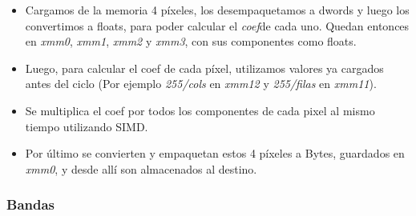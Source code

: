 \documentclass[a4paper]{article}
\begin{document}
\begin{itemize}
\item Cargamos de la memoria 4 p\'{i}xeles, los desempaquetamos a dwords y luego los convertimos a floats, para poder calcular el \textit{coef}de cada uno. Quedan entonces en \textit{xmm0}, \textit{xmm1}, \textit{xmm2} y \textit{xmm3}, con sus componentes como floats.\\

\item Luego, para calcular el coef de cada p\'{i}xel, utilizamos valores ya cargados antes del ciclo (Por ejemplo \textit{255/cols} en \textit{xmm12} y \textit{255/filas} en \textit{xmm11}). \\

\item Se multiplica el coef por todos los componentes de cada pixel al mismo tiempo utilizando SIMD. \\

\item Por \'{u}ltimo se convierten y empaquetan estos 4 p\'{i}xeles a Bytes, guardados en \textit{xmm0}, y desde all\'{i} son almacenados al destino. 

\end{itemize}



\subsubsection{Bandas}
\end{document}
